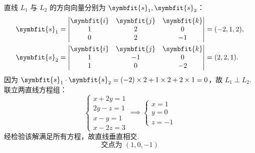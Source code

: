\begin{solution}

    直线 $L_1$ 与 $L_2$ 的方向向量分别为 $\symbfit{s}_1, \symbfit{s}_2$：
    \begin{equation*}
        \begin{aligned}
            \symbfit{s}_1 & = \begin{vmatrix} \symbfit{i} & \symbfit{j} & \symbfit{k} \\ 1 & 2 & 0 \\ 0 & 2 & -1 \end{vmatrix} = (-2, 1, 2), \\
            \symbfit{s}_2 & = \begin{vmatrix} \symbfit{i} & \symbfit{j} & \symbfit{k} \\ 1 & -1 & 0 \\ 1 & 0 & -2 \end{vmatrix} = (2, 2, 1).
        \end{aligned}
    \end{equation*}
    因为 $\symbfit{s}_1 \cdot \symbfit{s}_2 = (-2) \times 2 + 1 \times 2 + 2 \times 1 = 0$，故 $L_1 \perp L_2$.
    联立两直线方程组：
    \begin{equation*}
        \begin{cases} x + 2y = 1 \\ 2y - z = 1 \\ x - y = 1 \\ x - 2z = 3 \end{cases} \implies \begin{cases} x = 1 \\ y = 0 \\ z = -1 \end{cases}
    \end{equation*}
    经检验该解满足所有方程，故直线垂直相交.
    \begin{equation*}
        \boxed{ \text{交点为 } (1, 0, -1) }
    \end{equation*}



\end{solution}
